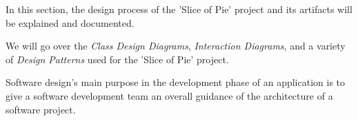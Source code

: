 In this section, the design process of the 'Slice of Pie' project and its artifacts will be explained and documented.

We will go over the \emph{Class Design Diagrams}, \emph{Interaction Diagrams}, and a variety of \emph{Design Patterns} used for the 'Slice of Pie' project.

Software design's main purpose in the development phase of an application is to give a software development team an overall guidance of the architecture
of a software project.
